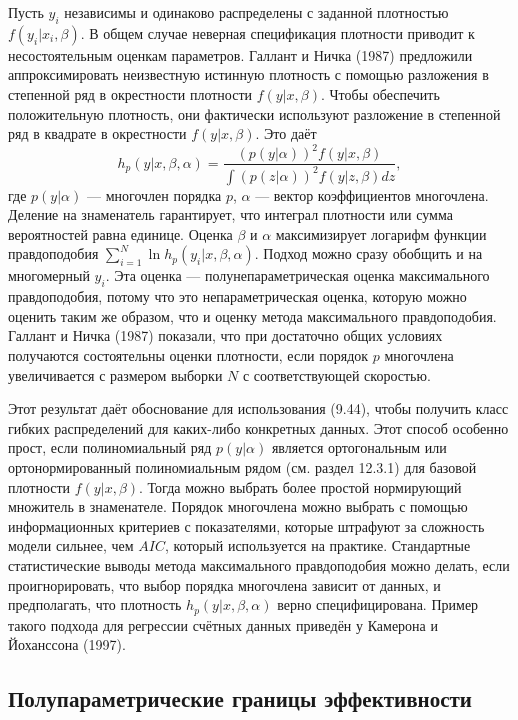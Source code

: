 Пусть $y_i$ независимы и одинаково распределены с заданной плотностью $f(y_i|x_i,\beta)$. В общем случае неверная спецификация плотности приводит к несостоятельным оценкам параметров. Галлант и Ничка (1987) предложили аппроксимировать неизвестную истинную плотность с помощью разложения в степенной ряд в окрестности плотности $f(y|x,\beta)$. Чтобы обеспечить положительную плотность, они фактически используют разложение в степенной ряд в квадрате в окрестности $f(y|x,\beta)$. Это даёт
\begin{equation}
h_p(y|x,\beta, \alpha) = \frac{(p(y|\alpha))^2f(y|x,\beta)}{\int (p(z|\alpha))^2f(y|z,\beta)dz},
\end{equation}
где $p(y|\alpha)$ --- многочлен порядка $p$, $\alpha$ --- вектор коэффициентов многочлена. Деление на знаменатель гарантирует, что интеграл плотности или  сумма вероятностей равна единице. Оценка $\beta$ и $\alpha$ максимизирует логарифм функции правдоподобия $\sum_{i=1}^N \ln h_p(y_i|x,\beta, \alpha)$. Подход можно сразу обобщить и на многомерный $y_i$. Эта оценка --- полунепараметрическая оценка максимального правдоподобия, потому что это непараметрическая оценка, которую можно оценить таким же образом, что и оценку метода максимального правдоподобия. Галлант и Ничка (1987) показали, что при достаточно общих условиях получаются состоятельны оценки плотности, если порядок $p$ многочлена увеличивается с размером выборки $N$ с соответствующей скоростью.

Этот результат даёт обоснование для использования (9.44), чтобы получить класс гибких распределений для каких-либо конкретных данных. Этот способ особенно прост, если полиномиальный ряд $p(y|\alpha)$ является ортогональным или ортонормированный полиномиальным рядом (см. раздел 12.3.1) для базовой плотности $f(y|x,\beta)$. Тогда можно выбрать более простой нормирующий множитель в знаменателе. Порядок многочлена можно выбрать с помощью информационных критериев с показателями, которые штрафуют за сложность модели сильнее, чем $AIC$, который используется на практике. Стандартные статистические выводы метода максимального правдоподобия можно делать, если проигнорировать, что выбор порядка многочлена зависит от данных, и предполагать, что плотность $h_p(y|x,\beta,\alpha)$ верно специфицирована. Пример такого подхода для регрессии счётных данных приведён у Камерона и Йоханссона (1997).

\subsection{Полупараметрические границы эффективности}

